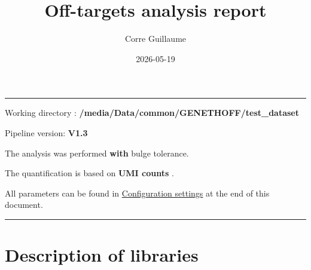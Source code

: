 \documentclass[
]{article}
\title{Off-targets analysis report}
\author{Corre Guillaume}
\date{2026-05-19}
\begin{document}
\maketitle

{
\setcounter{tocdepth}{2}
\tableofcontents
}
\begin{center}\rule{0.5\linewidth}{0.5pt}\end{center}

Working directory : \textbf{/media/Data/common/GENETHOFF/test\_dataset}

Pipeline version: \textbf{V1.3}

The analysis was performed \textbf{with} bulge tolerance.

The quantification is based on \textbf{UMI counts} .

All parameters can be found in
\hyperref[configuration-settings]{Configuration settings} at the end of
this document.

\begin{center}\rule{0.5\linewidth}{0.5pt}\end{center}

\section{Description of libraries}\label{description-of-libraries}

\begin{table}[H]
\centering\centering
\caption{\label{tab:unnamed-chunk-2}Table 1}
\centering
{}
\end{table}
\end{document}
